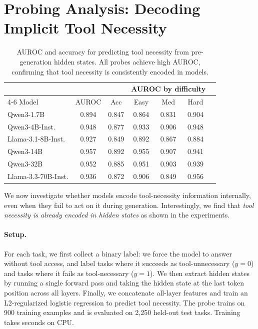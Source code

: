 \section{Probing Analysis: Decoding Implicit Tool Necessity}
\label{sec:probing}

\begin{table}[b!]
\vspace{-10pt}
\caption{AUROC and accuracy for predicting tool necessity from pre-generation hidden states. All probes achieve high AUROC, confirming that tool necessity is consistently encoded in models.}
\label{tab:probe_results}
\small
\centering
\begin{tabular}{lcccccc}
\toprule
& & & \multicolumn{3}{c}{AUROC by difficulty} \\
\cmidrule(lr){4-6}
Model & AUROC & Acc & Easy & Med & Hard \\
\midrule
Qwen3-1.7B            & 0.894 & 0.847 & 0.864 & 0.831 & 0.904 \\
Qwen3-4B-Inst.        & 0.948 & 0.877 & 0.933 & 0.906 & 0.948 \\
Llama-3.1-8B-Inst.    & 0.927 & 0.849 & 0.892 & 0.867 & 0.884 \\
Qwen3-14B             & 0.957 & 0.892 & 0.955 & 0.907 & 0.941 \\
Qwen3-32B             & 0.952 & 0.885 & 0.951 & 0.903 & 0.939 \\
Llama-3.3-70B-Inst.   & 0.936 & 0.872 & 0.906 & 0.849 & 0.956 \\
\bottomrule
\end{tabular}
\end{table}

We now investigate whether models encode tool-necessity information internally, even when they fail to act on it during generation. Interestingly, we find that \textit{tool necessity is already encoded in hidden states} as shown in the experiments. 


\paragraph{Setup.}
For each task, we first collect a binary label: we force the model to answer without tool access, and label tasks where it succeeds as tool-unnecessary ($y{=}0$) and tasks where it fails as tool-necessary ($y{=}1$). We then extract hidden states by running a single forward pass and taking the hidden state at the last token position across all layers. Finally, we concatenate all-layer features and train an L2-regularized logistic regression to predict tool necessity. The probe trains on 900 training examples and is evaluated on 2,250 held-out test tasks. Training takes seconds on CPU.
\vspace{-5pt}
